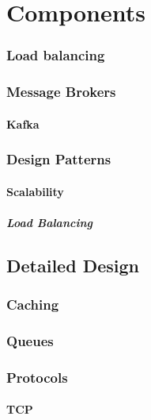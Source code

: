\chapter{Components}

\subsection{Load balancing}

\subsection{Message Brokers}

\subsubsection{Kafka}

\subsection{Design Patterns}

\subsubsection{Scalability}

\paragraph{Load Balancing}

\section{Detailed Design}

\subsection{Caching}

\subsection{Queues}

\subsection{Protocols}

\subsubsection{TCP}

